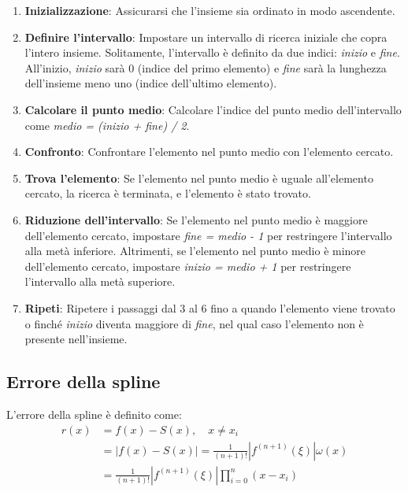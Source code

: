 \begin{enumerate}
  \item \textbf{Inizializzazione}: Assicurarsi che l'insieme sia ordinato in modo ascendente.

  \item \textbf{Definire l'intervallo}: Impostare un intervallo di ricerca iniziale che copra l'intero insieme. Solitamente, l'intervallo è definito da due indici: \textit{inizio} e \textit{fine}. All'inizio, \textit{inizio} sarà 0 (indice del primo elemento) e \textit{fine} sarà la lunghezza dell'insieme meno uno (indice dell'ultimo elemento).

  \item \textbf{Calcolare il punto medio}: Calcolare l'indice del punto medio dell'intervallo come \textit{medio = (inizio + fine) / 2}.

  \item \textbf{Confronto}: Confrontare l'elemento nel punto medio con l'elemento cercato.

  \item \textbf{Trova l'elemento}: Se l'elemento nel punto medio è uguale all'elemento cercato, la ricerca è terminata, e l'elemento è stato trovato.

  \item \textbf{Riduzione dell'intervallo}: Se l'elemento nel punto medio è maggiore dell'elemento cercato, impostare \textit{fine = medio - 1} per restringere l'intervallo alla metà inferiore. Altrimenti, se l'elemento nel punto medio è minore dell'elemento cercato, impostare \textit{inizio = medio + 1} per restringere l'intervallo alla metà superiore.

  \item \textbf{Ripeti}: Ripetere i passaggi dal 3 al 6 fino a quando l'elemento viene trovato o finché \textit{inizio} diventa maggiore di \textit{fine}, nel qual caso l'elemento non è presente nell'insieme.
\end{enumerate}



\subsection{Errore della spline}
L'errore della spline è definito come:
\begin{align}
  r(x) &= f(x) - S(x), \quad x \neq x_i \\
       &= | f(x) - S(x) | = \frac{1}{(n+1)!} | f^{(n+1)}(\xi) | \omega(x) \\
       &= \frac{1}{(n+1)!} | f^{(n+1)}(\xi) | \prod_{i=0}^n (x - x_i)
\end{align}





